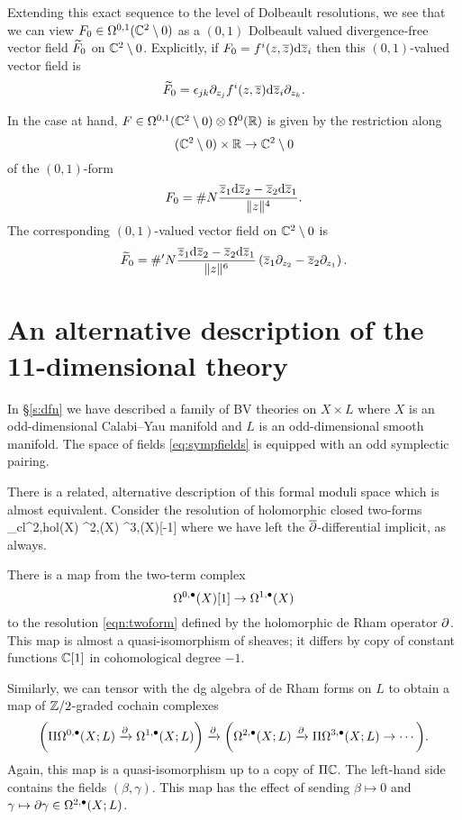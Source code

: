 \documentclass[11pt]{amsart}
\begin{document}
Extending this exact sequence to the level of Dolbeault resolutions, we see that we can view $F_0 \in \Omega^{0,1}(\mathbb C^2 \setminus 0)$ as a $(0,1)$ Dolbeault valued divergence-free vector field $\widetilde{F}_0$ on $\mathbb C^2 \setminus 0$. 
Explicitly, if $F_0 = f^i (z,\overline{z}) {\rm d} \overline{z}_i$ then this $(0,1)$-valued vector field is
\[
\widetilde{F}_0 = \epsilon_{jk} \partial_{z_j} f^i (z,\overline{z}) {\rm d} \overline{z}_i \partial_{z_k} .
\]

In the case at hand, $F \in \Omega^{0,1}(\mathbb C^2 \setminus 0) \otimes \Omega^0(\mathbb R)$ is given by the restriction along 
\[
(\mathbb C^2 \setminus 0) \times \mathbb R \to \mathbb C^2 \setminus 0
\]
of the $(0,1)$-form
\[
F_0 = \# N \frac{\overline{z}_1 {\rm d} \overline{z}_2 - \overline{z}_2 {\rm d} \overline{z}_1}{\|z\|^4} .
\] 
The corresponding $(0,1)$-valued vector field on $\mathbb C^2 \setminus 0$ is
\[
\widetilde{F}_0 = \#' N \frac{\overline{z}_1 {\rm d} \overline{z}_2 - \overline{z}_2 {\rm d} \overline{z}_1}{\|z\|^6} \left(\overline{z}_1 \partial_{z_2} - \overline{z}_2 \partial_{z_1}\right) .
\] 

\appendix 

\section{An alternative description of the 11-dimensional theory} 
In \S \ref{s:dfn} we have described a family of BV theories on $X \times L$ where $X$ is an odd-dimensional Calabi--Yau manifold and $L$ is an odd-dimensional smooth manifold. 
The space of fields \eqref{eq:sympfields} is equipped with an odd symplectic pairing. 


There is a related, alternative description of this formal moduli space which is almost equivalent. 
Consider the resolution of holomorphic closed two-forms 
\beqn\label{eqn:twoform}
\Omega_{cl}^{2,hol}(X) \simeq \Omega^{2,\bu}(X) \xto{\del} \Omega^{3,\bu}(X)[-1] \to \cdots 
\eeqn
where we have left the $\overline{\partial}$-differential implicit, as always. 

There is a map from the two-term complex 
\[
\Omega^{0,\bullet}(X)[1] \to \Omega^{1,\bullet}(X)
\]
to the resolution \eqref{eqn:twoform} defined by the holomorphic de Rham operator $\partial$. 
This map is almost a quasi-isomorphism of sheaves; it differs by copy of constant functions $\mathbb C[1]$ in cohomological degree $-1$. 

Similarly, we can tensor with the dg algebra of de Rham forms on $L$ to obtain a map of $\mathbb Z/2$-graded cochain complexes
\[
\bigg(\Pi \Omega^{0,\bullet}(X;L) \xrightarrow{\partial} \Omega^{1,\bullet}(X;L) \bigg) \xrightarrow{\partial} \bigg(\Omega^{2,\bullet}(X;L) \xrightarrow{\partial} \Pi \Omega^{3,\bullet}(X;L) \to \cdots \bigg) .
\]
Again, this map is a quasi-isomorphism up to a copy of $\Pi \mathbb C$.
The left-hand side contains the fields $(\beta, \gamma)$. 
This map has the effect of sending $\beta \mapsto 0$ and $\gamma \mapsto \partial \gamma \in \Omega^{2,\bullet}(X;L)$. 
\end{document}
